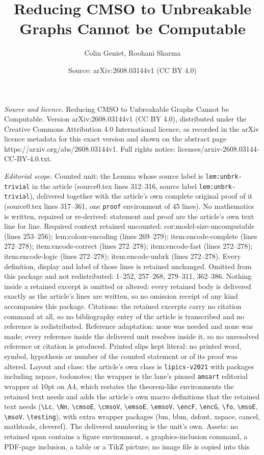 \documentclass[10pt,a4paper]{amsart}
\title[Reducing CMSO to Unbreakable Graphs Cannot be Computable]{Reducing CMSO to Unbreakable Graphs Cannot be Computable}
\author{Colin Geniet, Roohani Sharma}
\date{Source: arXiv:2608.03144v1 (CC BY 4.0)}
\begin{document}
\maketitle

\noindent\emph{Source and licence.} Reducing CMSO to Unbreakable Graphs Cannot be Computable. Version arXiv:2608.03144v1 (CC BY 4.0), distributed under the Creative Commons Attribution 4.0 International licence, as recorded in the arXiv licence metadata for this exact version and shown on the abstract page https://arxiv.org/abs/2608.03144v1. Full rights notice: licenses/arxiv-2608.03144-CC-BY-4.0.txt.\par\smallskip

\noindent\textit{Editorial scope.} Counted unit: the Lemma whose source label is \texttt{lem:unbrk-trivial} in the article (source0.tex lines 312--316, source label \texttt{lem:unbrk-trivial}), delivered together with the article's own complete original proof of it (source0.tex lines 317--361, one \texttt{proof} environment of 45 lines). No mathematics is written, repaired or re-derived: statement and proof are the article's own text line for line. Required context retained uncounted: cor:model-size-uncomputable (lines 253--256); lem:colour-encoding (lines 269--279); item:encode-complete (lines 272--278); item:encode-correct (lines 272--278); item:encode-fast (lines 272--278); item:encode-logic (lines 272--278); item:encode-unbrk (lines 272--278). Every definition, display and label of those lines is retained unchanged. Omitted from this package and not redistributed: 1--252, 257--268, 279--311, 362--386. Nothing inside a retained excerpt is omitted or altered: every retained body is delivered exactly as the article's lines are written, so no omission receipt of any kind accompanies this package. Citations: the retained excerpts carry no citation command at all, so no bibliography entry of the article is transcribed and no reference is redistributed. Reference adaptation: none was needed and none was made; every reference inside the delivered unit resolves inside it, so no unresolved reference or citation is produced. Printed slips kept literal: no printed word, symbol, hypothesis or number of the counted statement or of its proof was altered. Layout and class: the article's own class is \texttt{lipics-v2021} with packages including xspace, todonotes; the wrapper is the lane's pinned \texttt{amsart} editorial wrapper at 10pt on A4, which restates the theorem-like environments the retained text needs and adds the article's own macro definitions that the retained text needs (\texttt{\textbackslash Lc}, \texttt{\textbackslash Nn}, \texttt{\textbackslash cmsoE}, \texttt{\textbackslash cmsoV}, \texttt{\textbackslash emsoE}, \texttt{\textbackslash emsoV}, \texttt{\textbackslash encF}, \texttt{\textbackslash encG}, \texttt{\textbackslash fo}, \texttt{\textbackslash msoE}, \texttt{\textbackslash msoV}, \texttt{\textbackslash testing}), with extra wrapper packages (bm, bbm, dsfont, xspace, cancel, mathtools, cleveref). The delivered numbering is the unit's own. Assets: no retained span contains a figure environment, a graphics-inclusion command, a PDF-page inclusion, a table or a TikZ picture; no image file is copied into this 
\end{document}
